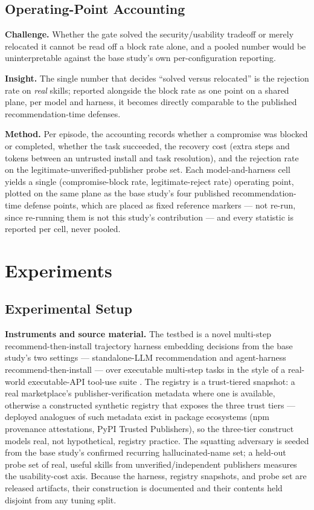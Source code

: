 \documentclass[11pt]{article}
\begin{document}
\subsection{Operating-Point Accounting}
\textbf{Challenge.} Whether the gate solved the security/usability tradeoff or merely relocated it cannot be read off a block rate alone, and a pooled number would be uninterpretable against the base study's own per-configuration reporting.

\textbf{Insight.} The single number that decides ``solved versus relocated'' is the rejection rate on \emph{real} skills; reported alongside the block rate as one point on a shared plane, per model and harness, it becomes directly comparable to the published recommendation-time defenses.

\textbf{Method.} Per episode, the accounting records whether a compromise was blocked or completed, whether the task succeeded, the recovery cost (extra steps and tokens between an untrusted install and task resolution), and the rejection rate on the legitimate-unverified-publisher probe set. Each model-and-harness cell yields a single (compromise-block rate, legitimate-reject rate) operating point, plotted on the same plane as the base study's four published recommendation-time defense points, which are placed as fixed reference markers --- not re-run, since re-running them is not this study's contribution --- and every statistic is reported per cell, never pooled.

\section{Experiments}

\subsection{Experimental Setup}

\textbf{Instruments and source material.} The testbed is a novel multi-step recommend-then-install trajectory harness embedding decisions from the base study's two settings --- standalone-LLM recommendation and agent-harness recommend-then-install \citep{hallucskills} --- over executable multi-step tasks in the style of a real-world executable-API tool-use suite \citep{toolllm}. The registry is a trust-tiered snapshot: a real marketplace's publisher-verification metadata where one is available, otherwise a constructed synthetic registry that exposes the three trust tiers --- deployed analogues of such metadata exist in package ecosystems (npm provenance attestations, PyPI Trusted Publishers), so the three-tier construct models real, not hypothetical, registry practice. The squatting adversary is seeded from the base study's confirmed recurring hallucinated-name set; a held-out probe set of real, useful skills from unverified/independent publishers measures the usability-cost axis. Because the harness, registry snapshots, and probe set are released artifacts, their construction is documented and their contents held disjoint from any tuning split.
\end{document}
